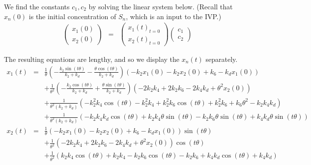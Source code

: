 \documentclass{bmcart}
\begin{document}
We find the constants $c_1, c_2$ by solving the linear system below. (Recall that $x_n (0)$ is the initial concentration of $S_n$, which is an input to the IVP.)
\begin{eqnarray*}
\begin{pmatrix} x_1 (0) \\ x_2 (0) \end{pmatrix}   & = & \begin{pmatrix} x_1 (t)_{t=0} \\ x_2 (t)_{t=0} \end{pmatrix}  \begin{pmatrix} c_1 \\ c_2 \end{pmatrix} 
\end{eqnarray*}

The resulting equations are lengthy, and so we display the $x_n (t)$ separately.
\begin{eqnarray}
x_1 (t) & =  &
\frac{1}{\theta}
\left(- \frac{k_{2} \sin{\left(t \theta \right)}}{k_{2} + k_{d}} - \frac{\theta \cos{\left(t \theta \right)}}{k_{2} + k_{d}}\right)
\left(- k_{2} x_1 (0) - k_{2} x_2 (0) + k_{6} - k_{d} x_1 (0)\right)\\ \nonumber
 \label{eq:x1}
& & + \frac{1}{\theta^2}
\left(- \frac{k_{2} \cos{\left(t \theta \right)}}{k_{2} + k_{d}} + \frac{\theta \sin{\left(t \theta \right)}}{k_{2} + k_{d}}\right) \left(- 2 k_{2} k_{4} + 2 k_{2} k_{6} - 2 k_{4} k_{d} + \theta^{2} x_2 (0)\right)   \\ \nonumber
& & + \frac{1}{\theta^2 (k_2 + k_d)} \left(
- k_{2}^{2} k_{4} \cos{\left(t \theta \right)} - k_{2}^{2} k_{4} + k_{2}^{2} k_{6} \cos{\left(t \theta \right) + k_2^2 k_6 + k_6 \theta^2 -k_2 k_4 k_d} \right) \\ \nonumber
& & + \frac{1}{\theta^2 (k_2 + k_d)} \left(
- k_{2} k_{4} k_{d} \cos{\left(t \theta \right)}
 + k_{2} k_{4} \theta \sin{\left(t \theta \right)} - k_{2} k_{6} \theta \sin{\left(t \theta \right)} + k_{4} k_{d} \theta \sin{\left(t \theta \right)} \right)
\end{eqnarray}
\begin{eqnarray}
x_2 (t) & = &
\frac{1}{\theta}
\left(- k_{2} x_1 (0) - k_{2} x_2 (0) + k_{6} - k_{d} x_1 (0)\right) \sin{\left(t \theta \right)} \\ \nonumber
& & + \frac{1}{\theta^2}
\left(- 2 k_{2} k_{4} + 2 k_{2} k_{6} - 2 k_{4} k_{d} + \theta^{2} x_2 (0)\right) \cos{\left(t \theta \right)} \\ \nonumber
& & + \frac{1}{\theta^2}
\left( k_{2} k_{4} \cos{\left(t \theta \right)} + k_{2} k_{4} - k_{2} k_{6} \cos{\left(t \theta \right)} - k_{2} k_{6} + k_{4} k_{d} \cos{\left(t \theta \right)} + k_{4} k_{d} \right)
 \label{eq:x2}
\end{eqnarray}
\end{document}
